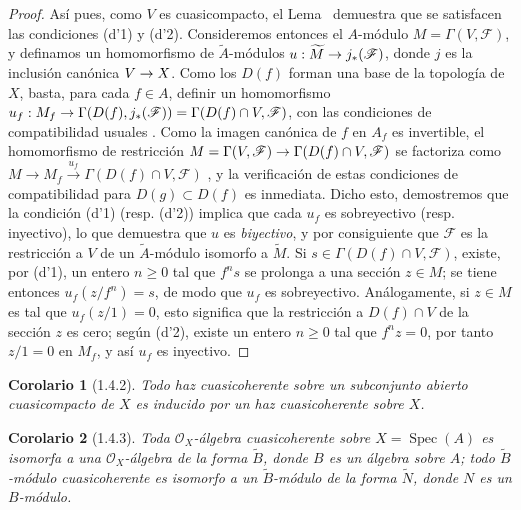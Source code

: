 \documentclass[oneside]{amsart}
\theoremstyle{ega-env-style}
\theoremstyle{ega-thm-env-style}
\newtheorem*{corollary}{Corolario}
\theoremstyle{ega-defn-env-style}
\def\geq{\geqslant}                 %
\renewcommand{\to}{\mathchoice{\longrightarrow}{\rightarrow}{\rightarrow}{\rightarrow}}
\let\EGAOriginalLabel\label
\renewcommand{\label}[1]{\phantomsection\EGAOriginalLabel{#1}}
\begin{document}
\begin{proof}
Así pues, como $V$ es cuasicompacto, el Lema~ demuestra que
se satisfacen las condiciones (d'1) y (d'2).
Consideremos entonces el $A$-módulo $M=\Gamma(V,\mathscr{F})$, y definamos un homomorfismo de $\widetilde{A}$-módulos $u:\widetilde{M}\to j_*(\mathscr{F})$, donde $j$ es la inclusión canónica $V\to X$.
Como los $D(f)$ forman una base de la topología de $X$, basta, para cada $f\in A$, definir un homomorfismo $u_f:M_f\to\Gamma(D(f),j_*(\mathscr{F}))=\Gamma(D(f)\cap V,\mathscr{F})$, con las condiciones de compatibilidad usuales .
Como la imagen canónica de $f$ en $A_f$ es invertible, el homomorfismo de restricción $M=\Gamma(V,\mathscr{F})\to\Gamma(D(f)\cap V,\mathscr{F})$ se factoriza como $M\longrightarrow M_f\xrightarrow{u_f}\Gamma(D(f)\cap V,\mathscr{F})$ , y la verificación de estas condiciones de compatibilidad para $D(g)\subset D(f)$ es inmediata.
Dicho esto, demostremos que la condición (d'1) (resp. (d'2)) implica que cada $u_f$ es sobreyectivo (resp. inyectivo), lo que demuestra que $u$ es \emph{biyectivo}, y por consiguiente que $\mathscr{F}$ es la restricción a $V$ de un $\widetilde{A}$-módulo isomorfo a $\widetilde{M}$.
Si $s\in\Gamma(D(f)\cap V,\mathscr{F})$, existe, por (d'1), un entero $n\geq0$ tal que $f^n s$ se prolonga a una sección $z\in M$;
se tiene entonces $u_f(z/f^n)=s$, de modo que $u_f$ es sobreyectivo.
Análogamente, si $z\in M$ es tal que $u_f(z/1)=0$, esto significa que la restricción a $D(f)\cap V$ de la sección $z$ es cero;
según (d'2), existe un entero $n\geq0$ tal que $f^n z=0$, por tanto $z/1=0$ en $M_f$, y así $u_f$ es inyectivo.
\end{proof}

\begin{corollary}[1.4.2]
\label{I.1.4.2}
Todo haz cuasicoherente sobre un subconjunto abierto cuasicompacto de $X$ es inducido por un haz cuasicoherente sobre $X$.
\end{corollary}

\begin{corollary}[1.4.3]
\label{I.1.4.3}
Toda $\mathscr{O}_X$-álgebra cuasicoherente sobre $X=\operatorname{Spec}(A)$ es isomorfa a una $\mathscr{O}_X$-álgebra de la forma $\widetilde{B}$, donde $B$ es un álgebra sobre $A$;
todo $\widetilde{B}$-módulo cuasicoherente es isomorfo a un $\widetilde{B}$-módulo de la forma $\widetilde{N}$, donde $N$ es un $B$-módulo.
\end{corollary}
\end{document}

